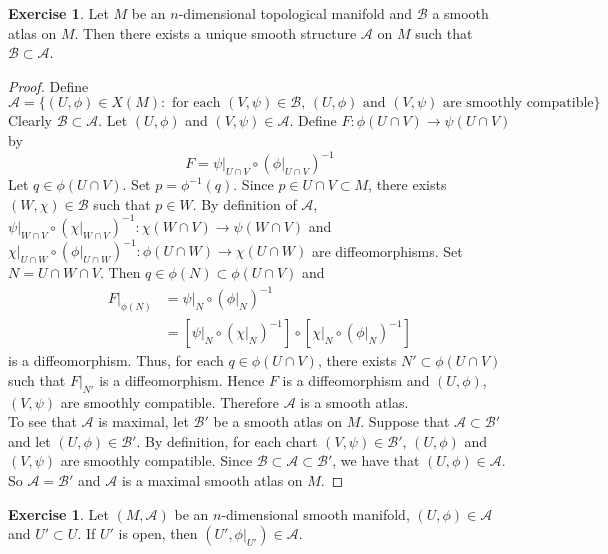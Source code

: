 \documentclass{book}
\theoremstyle{definition}
\newtheorem{ex}[definition]{Exercise}
\newcommand{\MA}{\mathcal{A}}
\newcommand{\MB}{\mathcal{B}}
\DeclareMathOperator*{\0}{\mbf{0}}
\DeclareMathOperator*{\1}{\mbf{1}}
\begin{document}
	\begin{ex}
		Let $M$ be an $n$-dimensional topological manifold and $\MB$ a smooth atlas on $M$. Then there exists a unique smooth structure $\MA$ on $M$ such that $\MB \subset \MA$.
	\end{ex}

	\begin{proof}
		Define 
		$$\MA = \{(U, \phi) \in X(M): \text{ for each $(V, \psi) \in \MB$,  $(U, \phi)$ and $(V, \psi) $ are smoothly compatible}\}$$ 
		Clearly $\MB \subset \MA$. Let $(U, \phi)$ and $(V, \psi) \in \MA$. Define $F: \phi(U \cap V) \rightarrow \psi (U \cap V)$ by 
		$$F = \psi|_{U \cap V} \circ (\phi|_{U \cap V})^{-1}$$
		Let $q \in \phi(U \cap V)$. Set $p = \phi^{-1}(q)$. Since $p \in U \cap V \subset M$, there exists $(W, \chi) \in \MB$ such that $p \in W$. By definition of $\MA$, $\psi|_{W \cap V} \circ (\chi|_{W \cap V})^{-1} : \chi(W \cap V) \rightarrow \psi(W \cap V)$ and $ \chi|_{U \cap W} \circ (\phi|_{U \cap W})^{-1} : \phi(U \cap W) \rightarrow \chi(U \cap W)$ are diffeomorphisms. Set $N = U \cap W \cap V$. Then $q \in \phi(N) \subset \phi(U \cap V)$ and 
		\begin{align*}
			F|_{\phi(N)}
			& = \psi|_{N} \circ (\phi|_{N})^{-1} \\
			& = [\psi|_{N} \circ (\chi|_{N})^{-1}] \circ [\chi|_{N} \circ (\phi|_{N})^{-1}]
		\end{align*}
		is a diffeomorphism. 
		Thus, for each $q \in \phi(U \cap V)$, there exists $N' \subset \phi(U \cap V)$ such that $F|_{N'}$ is a diffeomorphism. Hence $F$ is a diffeomorphism and $(U, \phi)$, $(V, \psi)$ are smoothly compatible. Therefore $\MA$ is a smooth atlas.\\
		To see that $\MA$ is maximal, let $\MB'$ be a smooth atlas on $M$. Suppose that $\MA \subset \MB'$ and let $(U, \phi) \in \MB'$. By definition, for each chart $(V, \psi) \in \MB'$, $(U, \phi)$ and $(V, \psi)$ are smoothly compatible. Since $\MB \subset \MA \subset \MB'$, we have that $(U, \phi) \in \MA$. So $\MA = \MB'$ and $\MA$ is a maximal smooth atlas on $M$.
	\end{proof}

	\begin{ex}
		Let $(M, \MA)$ be an $n$-dimensional smooth manifold, $(U, \phi) \in \MA$ and $U' \subset U$. If $U'$ is open, then $(U', \phi|_{U'}) \in \MA$. 
	\end{ex}
\end{document}
